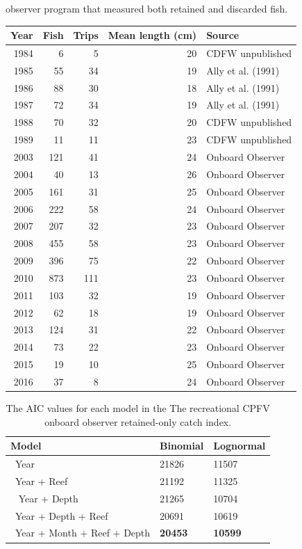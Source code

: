 \documentclass[12pt,]{article}
\begin{document}
\begin{table}[ht]
{                                            observer program that measured both retained and discarded
                                            fish.} 
\label{tab:Fleet6_lengthsample}
\begin{tabular}{rrrrl}
  \hline
Year & Fish & Trips & Mean length (cm) & Source \\ 
  \hline
1984 & 6 & 5 & 20 & CDFW unpublished \\ 
  1985 & 55 & 34 & 19 & Ally et al. (1991) \\ 
  1986 & 88 & 30 & 18 & Ally et al. (1991) \\ 
  1987 & 72 & 34 & 19 & Ally et al. (1991) \\ 
  1988 & 70 & 32 & 20 & CDFW unpublished \\ 
  1989 & 11 & 11 & 23 & CDFW unpublished \\ 
  2003 & 121 & 41 & 24 & Onboard Observer \\ 
  2004 & 40 & 13 & 26 & Onboard Observer \\ 
  2005 & 161 & 31 & 25 & Onboard Observer \\ 
  2006 & 222 & 58 & 24 & Onboard Observer \\ 
  2007 & 207 & 32 & 23 & Onboard Observer \\ 
  2008 & 455 & 58 & 23 & Onboard Observer \\ 
  2009 & 396 & 75 & 22 & Onboard Observer \\ 
  2010 & 873 & 111 & 23 & Onboard Observer \\ 
  2011 & 103 & 32 & 19 & Onboard Observer \\ 
  2012 & 62 & 18 & 19 & Onboard Observer \\ 
  2013 & 124 & 31 & 22 & Onboard Observer \\ 
  2014 & 73 & 22 & 23 & Onboard Observer \\ 
  2015 & 19 & 10 & 25 & Onboard Observer \\ 
  2016 & 37 & 8 & 24 & Onboard Observer \\ 
   \hline
\end{tabular}
\end{table}\begin{table}[ht]
\centering
\caption{The AIC values for each model in the
                                          The recreational CPFV onboard 
                                          observer retained-only catch 
                                          index.} 
\label{tab:Fleet12_RecPC_onboard_aic}
\begin{tabular}{lll}
  \hline
Model & Binomial & Lognormal \\ 
  \hline
~Year & 21826 & 11507 \\ 
  ~Year + Reef & 21192 & 11325 \\ 
  ~ Year + Depth & 21265 & 10704 \\ 
  ~Year + Depth + Reef & 20691 & 10619 \\ 
  ~Year + Month + Reef + Depth & \textbf{20453} & \textbf{10599} \\ 
   \hline
\end{tabular}
\end{table}\vspace{2in}
\end{document}
